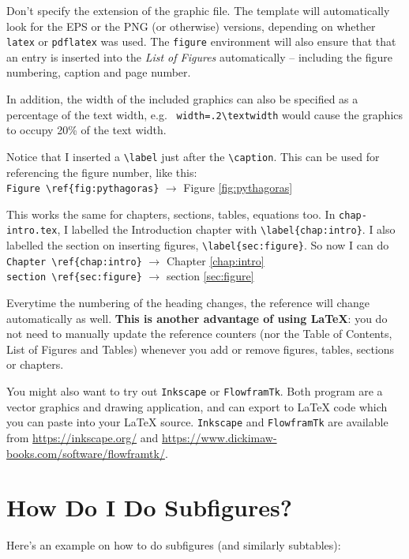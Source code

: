 Don't specify the extension of the graphic file.  The template will automatically look for the EPS or the PNG (or otherwise) versions, depending on whether \verb|latex| or \verb|pdflatex| was used.  The \texttt{figure} environment will also ensure that that an entry is inserted into the \emph{List of Figures} automatically -- including the figure numbering, caption and page number.

In addition, the width of the included graphics can also be specified as a percentage of the text width, e.g.~ \verb|width=.2\textwidth| would cause the graphics to occupy 20\% of the text width.

Notice that I inserted a \verb|\label| just after the \verb|\caption|.  This can be used for referencing the figure number, like this: \\
\verb|Figure \ref{fig:pythagoras}| $\to$ Figure \ref{fig:pythagoras}

This works the same for chapters, sections, tables, equations too.  In \verb|chap-intro.tex|, I labelled the Introduction chapter with \verb|\label{chap:intro}|.  I also labelled the section on inserting figures, \verb|\label{sec:figure}|.  So now I can do \\
\verb|Chapter \ref{chap:intro}| $\to$  Chapter \ref{chap:intro} \\
\verb|section \ref{sec:figure}| $\to$  section \ref{sec:figure}

Everytime the numbering of the heading changes, the reference will change automatically as well.  \textbf{This is another advantage of using \LaTeX{}}: you do not need to manually update the reference counters (nor the Table of Contents, List of Figures and Tables) whenever you add or remove figures, tables, sections or chapters.

You might also want to try out \texttt{Inkscape} or \texttt{FlowframTk}. Both program are a vector graphics and drawing application, and can export to \LaTeX{} code which you can paste into your \LaTeX{} source. \texttt{Inkscape} and \texttt{FlowframTk} are available from \url{https://inkscape.org/} and \url{https://www.dickimaw-books.com/software/flowframtk/}.

\section{How Do I Do Subfigures?}
Here's an example on how to do subfigures (and similarly subtables):

